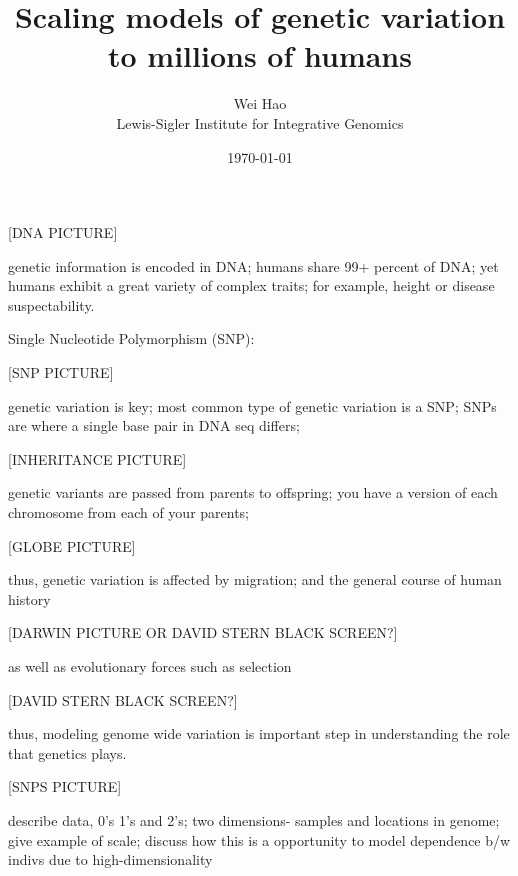 \documentclass[serif,14pt]{beamer}
\title{ Scaling models of genetic variation to millions of humans }
\author{ Wei Hao \\ {\footnotesize Lewis-Sigler Institute for Integrative Genomics}}
\date{\today}
\begin{document}
\setlength{\parskip}{8pt}

\begin{frame}
  \titlepage
\end{frame}

\begin{frame}

[DNA PICTURE]

genetic information is encoded in DNA; humans share 99+ percent of DNA; yet humans exhibit a great variety of complex traits; for example, height or disease suspectability.
\end{frame}

\begin{frame}
Single Nucleotide Polymorphism (SNP):

[SNP PICTURE]

genetic variation is key; most common type of genetic variation is a SNP; SNPs are where a single base pair in DNA seq differs; 
\end{frame}

\begin{frame}

[INHERITANCE PICTURE]

genetic variants are passed from parents to offspring; you have a version of each chromosome from each of your parents;
\end{frame}

\begin{frame}

[GLOBE PICTURE]

thus, genetic variation is affected by migration; and the general course of human history
\end{frame}

\begin{frame}

[DARWIN PICTURE OR DAVID STERN BLACK SCREEN?]

as well as evolutionary forces such as selection
\end{frame}

\begin{frame}

[DAVID STERN BLACK SCREEN?]

thus, modeling genome wide variation is important step in understanding the role that genetics plays.
\end{frame}

\begin{frame}

[SNPS PICTURE]

describe data, 0's 1's and 2's; two dimensions- samples and locations in genome; give example of scale; discuss how this is a opportunity to model dependence b/w indivs due to high-dimensionality
\end{frame}
\end{document}
